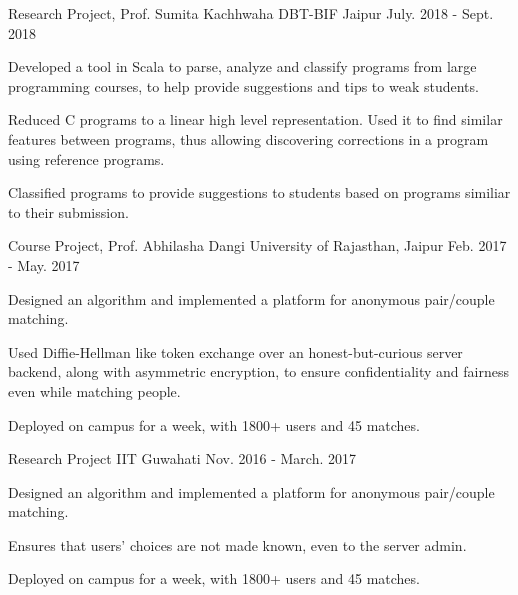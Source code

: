 

\begin{cventries}

  \cventry
  {Research Project, Prof. Sumita Kachhwaha}
  {\href{https://github.com/DBT-BIF/Biosensor-Python}{}
    {}}
  {DBT-BIF Jaipur}
  {July. 2018 - Sept. 2018}
  {
    \begin{cvitems}
    \item Developed a tool in Scala to parse, analyze and classify  programs from large programming courses, to help provide
      suggestions and tips to weak students.
    \item Reduced C programs to a linear high level representation. Used it to find similar features between programs, thus allowing discovering corrections in a program using reference programs.
    \item Classified programs to provide suggestions to students based on programs similiar to their submission.
    \end{cvitems}
  }
  \cventry
  {Course Project, Prof. Abhilasha Dangi}
  {\href{https://github.com/pclubiitk/puppy-love}{}}
  {University of Rajasthan, Jaipur}
  {Feb. 2017 - May. 2017}
  {
    \begin{cvitems}
      \item Designed an algorithm and implemented a platform
        for anonymous pair/couple matching.
      \item Used Diffie-Hellman like token exchange over an
        honest-but-curious server backend, along with asymmetric encryption, to
        ensure confidentiality and fairness even while matching people.
      \item Deployed on campus for a week, with 1800+ users and 45 matches.
    \end{cvitems}
  }
  \cventry
  {Research Project}
  {\href{https://github.com/pclubiitk/puppy-love}{}}
  {IIT Guwahati}
  {Nov. 2016 - March. 2017}
  {
    \begin{cvitems}
      \item Designed an algorithm and implemented a platform
        for anonymous pair/couple matching.
      \item Ensures that users' choices are not made known, even to the
        server admin.
      \item Deployed on campus for a week, with 1800+ users and 45 matches.
    \end{cvitems}
  }




\end{cventries}
